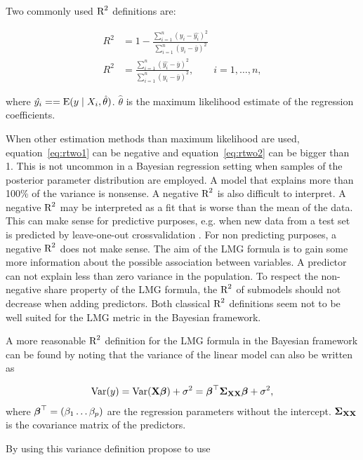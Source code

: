 \documentclass[11pt,a4paper,twoside]{book}
\begin{document}
Two commonly used $\text{R}^2$ definitions are:
   
      \begin{align} 
     R^2 &= 1 - \frac{\sum_{i=1}^{n}(y_{i} - \hat{y_{i}})^2}{\sum_{i=1}^{n}(y_{i}-\bar{y})^2}   \label{eq:rtwo1} \\
     R^2 &= \frac{\sum_{i=1}^{n}(\hat{y_{i}} - \bar{y})^2}{\sum_{i=1}^{n}(y_{i}-\bar{y})^2}, \qquad i = 1,\dots,n,   \label{eq:rtwo2} 
   \end{align} 
   
where $\hat{y_{i}} = = \operatorname{E} ({y \mid X_{i}, \hat{\theta}})$.  $\hat{\theta}$ is the maximum likelihood estimate of the regression coefficients.


When other estimation methods than maximum likelihood are used, equation~\eqref{eq:rtwo1} can be negative and equation~\eqref{eq:rtwo2}  can be bigger than 1. This is not uncommon in a Bayesian regression setting when samples of the posterior parameter distribution are employed. A model that explains more than 100\% of the variance is nonsense. A negative $\text{R}^2$ is also difficult to interpret. A negative $\text{R}^2$ may be interpreted as a fit that is worse than the mean of the data. This can make sense for predictive purposes, e.g. when new data from a test set is predicted by leave-one-out crossvalidation \citep{Alexander2015}.  For non predicting purposes, a negative $\text{R}^2$ does not make sense. The aim of the LMG formula is to gain some more information about the possible association between variables. A predictor can not explain less than zero variance in the population. To respect the non-negative share property of the LMG formula, the $\text{R}^2$ of submodels should not decrease when adding predictors. Both classical $\text{R}^2$ definitions seem not to be well suited for the LMG metric in the Bayesian framework.

A more reasonable $\text{R}^2$ definition for the LMG formula in the Bayesian framework can be found by noting that the variance of the linear model can also be written as 

      \begin{align} 
        \operatorname{Var}(y) = \operatorname{Var}({\mathbf{X}} {\boldsymbol{\beta}}) + \sigma^2 = {\boldsymbol{\beta}}^\top {\boldsymbol{\Sigma}}{}_{{\mathbf{X}} {\mathbf{X}}}  {\boldsymbol{\beta}} + \sigma^2, \label{eq:vary} 
   \end{align}
where ${\boldsymbol{\beta}}^\top = (\beta_{1} \dots \beta_{p})$ are the regression parameters without the intercept.
${\boldsymbol{\Sigma}}{}_{{\mathbf{X}} {\mathbf{X}}}$ is the covariance matrix of the predictors.

By using this variance definition \cite{Gelman2017} propose to use 
\end{document}
